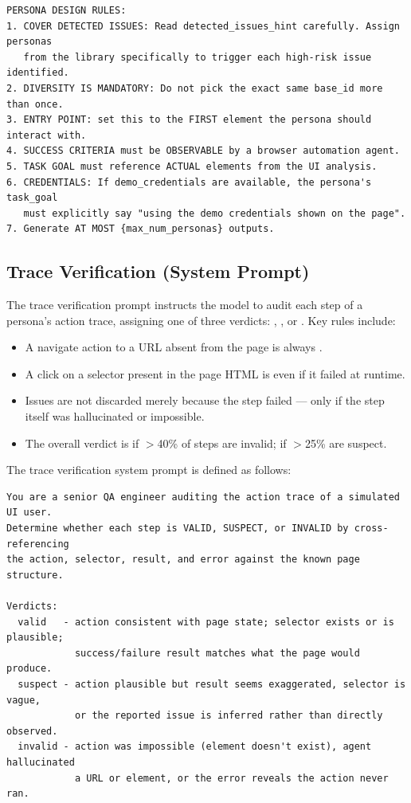 \begin{itemize}
\begin{lstlisting}[caption={Supervisor Persona Generation system prompt excerpt (from \filepath{prompts/supervisor\_prompts.py}).}, label={lst:persona-gen-prompt}]
PERSONA DESIGN RULES:
1. COVER DETECTED ISSUES: Read detected_issues_hint carefully. Assign personas
   from the library specifically to trigger each high-risk issue identified.
2. DIVERSITY IS MANDATORY: Do not pick the exact same base_id more than once.
3. ENTRY POINT: set this to the FIRST element the persona should interact with.
4. SUCCESS CRITERIA must be OBSERVABLE by a browser automation agent.
5. TASK GOAL must reference ACTUAL elements from the UI analysis.
6. CREDENTIALS: If demo_credentials are available, the persona's task_goal
   must explicitly say "using the demo credentials shown on the page".
7. Generate AT MOST {max_num_personas} outputs.
\end{lstlisting}

\subsection{Trace Verification (System Prompt)}

The trace verification prompt instructs the model to audit each step of a persona's action trace, assigning one of three verdicts: , , or . Key rules include:
\begin{itemize}
    \item A navigate action to a URL absent from the page is always .
    \item A click on a selector present in the page HTML is  even if it failed at runtime.
    \item Issues are not discarded merely because the step failed --- only if the step itself was hallucinated or impossible.
    \item The overall verdict is  if $>$40\% of steps are invalid;  if $>$25\% are suspect.
\end{itemize}

The trace verification system prompt is defined as follows:

\begin{lstlisting}[caption={Supervisor Trace Verification system prompt excerpt (from \filepath{prompts/supervisor\_prompts.py}).}, label={lst:trace-verify-prompt}]
You are a senior QA engineer auditing the action trace of a simulated UI user.
Determine whether each step is VALID, SUSPECT, or INVALID by cross-referencing
the action, selector, result, and error against the known page structure.

Verdicts:
  valid   - action consistent with page state; selector exists or is plausible;
            success/failure result matches what the page would produce.
  suspect - action plausible but result seems exaggerated, selector is vague,
            or the reported issue is inferred rather than directly observed.
  invalid - action was impossible (element doesn't exist), agent hallucinated
            a URL or element, or the error reveals the action never ran.


\end{lstlisting}
\end{itemize}
